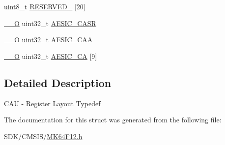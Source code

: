 \begin{DoxyCompactItemize}
\item 
uint8\+\_\+t \mbox{\hyperlink{group___v_r_e_f___peripheral___access___layer_ga7a67a27505bd4086d8923203f3b0e865}{R\+E\+S\+E\+R\+V\+E\+D\+\_}} \mbox{[}20\mbox{]}
\item 
\mbox{\hyperlink{core__cm4_8h_a7e25d9380f9ef903923964322e71f2f6}{\+\_\+\+\_\+O}} uint32\+\_\+t \mbox{\hyperlink{group___v_r_e_f___peripheral___access___layer_ga5f10e412e8a854eac83da5a01e48cc5a}{A\+E\+S\+I\+C\+\_\+\+C\+A\+SR}}
\item 
\mbox{\hyperlink{core__cm4_8h_a7e25d9380f9ef903923964322e71f2f6}{\+\_\+\+\_\+O}} uint32\+\_\+t \mbox{\hyperlink{group___v_r_e_f___peripheral___access___layer_ga31fd954e9ab3113ba3febc85f9dec36f}{A\+E\+S\+I\+C\+\_\+\+C\+AA}}
\item 
\mbox{\hyperlink{core__cm4_8h_a7e25d9380f9ef903923964322e71f2f6}{\+\_\+\+\_\+O}} uint32\+\_\+t \mbox{\hyperlink{group___v_r_e_f___peripheral___access___layer_ga93f384d53d5a0c3a60d70d5a1ee212b5}{A\+E\+S\+I\+C\+\_\+\+CA}} \mbox{[}9\mbox{]}
\end{DoxyCompactItemize}


\subsection{Detailed Description}
C\+AU -\/ Register Layout Typedef 

The documentation for this struct was generated from the following file\+:\begin{DoxyCompactItemize}
\item 
S\+D\+K/\+C\+M\+S\+I\+S/\mbox{\hyperlink{_m_k64_f12_8h}{M\+K64\+F12.\+h}}\end{DoxyCompactItemize}
